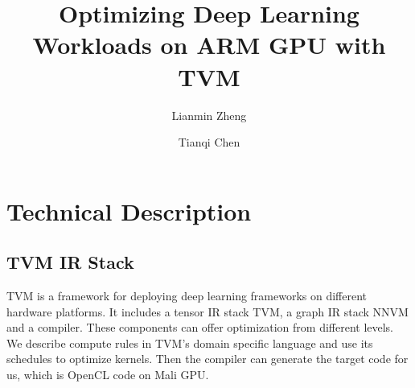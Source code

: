 \documentclass[sigplan]{acmart}
\begin{document}
\title{Optimizing Deep Learning Workloads on ARM GPU with TVM}

\author{Lianmin Zheng}

\author{Tianqi Chen}

\renewcommand{\shortauthors}{}
\renewcommand{\shorttitle}{}



\begin{abstract}

\end{abstract}

%
%




\maketitle

\section{Technical Description}

\subsection {TVM IR Stack}
TVM \cite{tqchen2017tvm} is a framework for deploying deep learning frameworks on different hardware platforms.
It includes a tensor IR stack TVM, a graph IR stack NNVM and a compiler. These components can offer optimization from different levels.
We describe compute rules in TVM's domain specific language and use its schedules to optimize kernels. 
Then the compiler can generate the target code for us, which is OpenCL code on Mali GPU.
\end{document}
